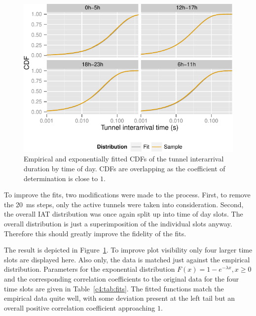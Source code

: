 \begin{figure}[htb]
  \centering
  \includegraphics[width=1.0\textwidth]{images/R-IAT-active-fit-cdf-facets.pdf}
  \caption{Empirical and exponentially fitted \glspl{CDF} of the tunnel interarrival duration by time of day. \glspl{CDF} are overlapping as the coefficient of determination is close to $1$.}
  \label{c4:fig:pdparrivalsecdf}
\end{figure}

To improve the fits, two modifications were made to the process. First, to remove the \SI{20}{\milli\second} steps, only the active tunnels were taken into consideration. Second, the overall \gls{IAT} distribution was once again split up into time of day slots. The overall distribution is just a superimposition of the individual slots anyway. Therefore this should greatly improve the fidelity of the fits. 

The result is depicted in Figure~\ref{c4:fig:pdparrivalsecdf}. To improve plot visibility only four larger time slots are displayed here. Also only, the data is matched just against the empirical distribution. Parameters for the exponential distribution $F(x) = 1- e^{-\lambda x}, x \geq 0$ and the corresponding correlation coefficients to the original data for the four time slots are given in Table~\ref{c4:tab:fits}. The fitted functions match the empirical data quite well, with some deviation present at the left tail but an overall positive correlation coefficient approaching $1$.


